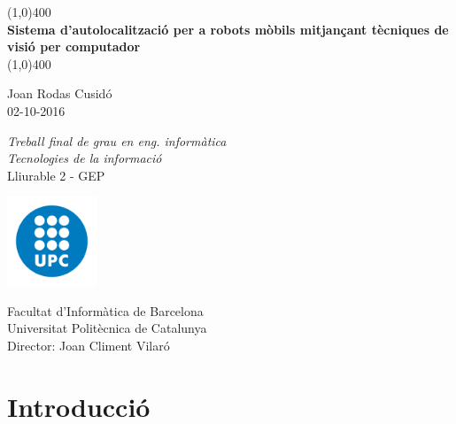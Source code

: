 \documentclass[a4paper,12pt]{report}
\begin{document}

	\begin{titlepage}
		\begin{center}
			\vspace*{1cm}

			\line(1,0){400}\\
			\vspace{0.3cm}
			\Huge
			\textbf{Sistema d'autolocalització per a robots mòbils mitjançant tècniques de visió per computador}\\
			\line(1,0){400}

			\vspace{1.0cm}
			\Large
			Joan Rodas Cusidó\\
			02-10-2016

			\vfill
			\LARGE
			\textit{Treball final de grau en eng. informàtica\\
			Tecnologies de la informació}\\
			\vspace{0.3cm}
			\normalsize{Lliurable 2 - GEP}

			\vspace{1.6cm}

			\includegraphics[width=0.2\textwidth]{images/logo}
			
			\vspace{0.5cm}

			\Large
			Facultat d'Informàtica de Barcelona\\
			Universitat Politècnica de Catalunya\\
			Director: Joan Climent Vilaró
		\end{center}
	\end{titlepage}
	
	
	\restoregeometry
	\setcounter{page}{2}
	
	\tableofcontents
	\chapter{Introducció}
	
\end{document}
